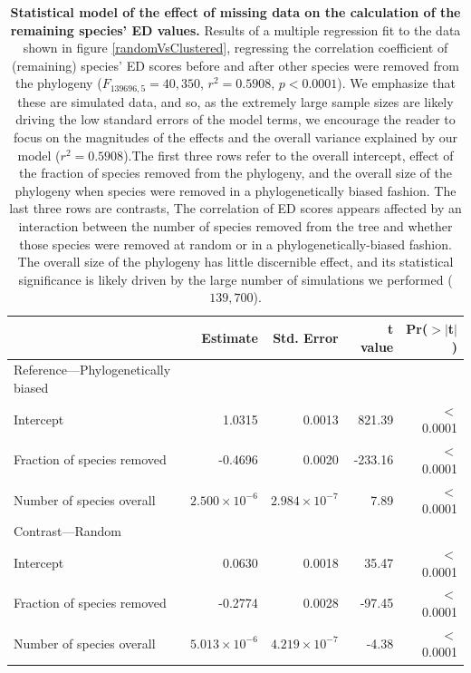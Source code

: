 \documentclass[10pt,english]{article}
\begin{document}
\begin{table}[ht]
  \centering
  \begin{tabular}{lrrrr}
    \hline
    & Estimate & Std. Error & t value & Pr($>$$|$t$|$) \\ \hline
    Reference---Phylogenetically biased\\
    Intercept & 1.0315 & 0.0013 & 821.39 & $<$0.0001 \\
    Fraction of species removed & -0.4696 & 0.0020 & -233.16 & $<$0.0001 \\
    Number of species overall & $2.500 \times 10^{-6}$ & $2.984 \times 10^{-7}$ & 7.89 & $<$0.0001 \\
    Contrast---Random\\
    Intercept & 0.0630 & 0.0018 & 35.47 & $<$0.0001 \\
    Fraction of species removed & -0.2774 & 0.0028 & -97.45 & $<$0.0001 \\
    Number of species overall & $5.013 \times 10^{-6}$ & $4.219 \times 10^{-7}$ & -4.38 & $<$0.0001 \\ \hline
  \end{tabular}
  \caption{\textbf{Statistical model of the effect of missing data on the
      calculation of the remaining species' ED values.} Results of a multiple
      regression fit to the data shown in figure \ref{randomVsClustered},
      regressing the correlation coefficient of (remaining) species' ED scores
      before and after other species were removed from the phylogeny
      ($F_{139696,5} = 40,350$, $r^{2} = 0.5908$, $p < 0.0001$). We emphasize
      that these are simulated data, and so, as the extremely large sample sizes
      are likely driving the low standard errors of the model terms, we
      encourage the reader to focus on the magnitudes of the effects and the
      overall variance explained by our model ($r^{2} = 0.5908$).The first three
      rows refer to the overall intercept, effect of the fraction of species
      removed from the phylogeny, and the overall size of the phylogeny when
      species were removed in a phylogenetically biased fashion. The last three
      rows are contrasts, 
       The correlation of
      ED scores appears affected by an interaction between the number of species
      removed from the tree and whether those species were removed at random or
      in a phylogenetically-biased fashion. The overall size of the phylogeny
      has little discernible effect, and its statistical significance is likely
      driven by the large number of simulations we performed ($139,700$).}
\label{missing_regression}
\end{table}
\end{document}
